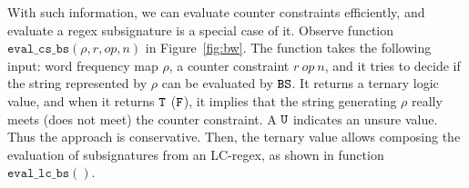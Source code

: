 With such information, we can evaluate counter constraints efficiently,
and evaluate a regex subsignature is a special case of it.
Observe function $\texttt{eval\_cs\_bs}(\rho, r, op, n)$
in Figure\ \ref{fig:bw}.  The function takes the following input:
word frequency map $\rho$, a counter constraint $r ~op~ n$, and 
it tries to decide if the string represented by $\rho$ can be evaluated 
by $\texttt{BS}$. It returns a ternary logic value, and when
it returns $\texttt{T}$ ($\texttt{F}$), it implies that the string generating $\rho$
really meets (does not meet) the counter constraint. A $\texttt{U}$
indicates an unsure value. Thus the approach is conservative.
Then, the ternary value allows composing the evaluation of
subsignatures from an LC-regex, as shown in function
$\texttt{eval\_lc\_bs}()$.

\def\gbw{\texttt{gbs}}
\def\hp{\hspace*{0.1in}}
